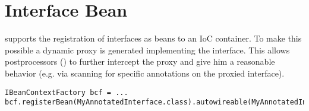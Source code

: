 \section{Interface Bean}
\label{feature:InterfaceBean}
\ClearAPI
\AMBETH{} supports the registration of interfaces as beans to an IoC container. To make this possible a dynamic proxy is generated implementing the interface. This allows postprocessors () to further intercept the proxy and give him a reasonable behavior (e.g. via scanning for specific annotations on the proxied interface).

\begin{lstlisting}[style=Java,caption={Example to register an interface as a bean (Java)}]
IBeanContextFactory bcf = ...
bcf.registerBean(MyAnnotatedInterface.class).autowireable(MyAnnotatedInterface.class);
\end{lstlisting}